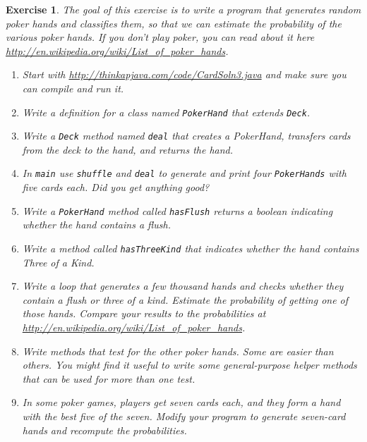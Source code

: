 \documentclass[12pt]{book}
\theoremstyle{exercise}
\newtheorem{exercise}{Exercise}[chapter]
\begin{document}
\begin{exercise}
The goal of this exercise is to write a program that generates random
poker hands and classifies them, so that we can estimate the
probability of the various poker hands.  If you don't play poker, you
can read about it here
\url{http://en.wikipedia.org/wiki/List_of_poker_hands}.

\begin{enumerate}

\item Start with \url{http://thinkapjava.com/code/CardSoln3.java}
and make sure you can compile and run it.

\item Write a definition for a class named {\tt PokerHand}
that extends {\tt Deck}.

\item Write a {\tt Deck} method named {\tt deal} that creates
a PokerHand, transfers cards from the deck to the hand, and returns
the hand.

\item In {\tt main} use {\tt shuffle} and
{\tt deal} to generate and print four {\tt PokerHands} with
five cards each.  Did you get anything good?

\item Write a {\tt PokerHand} method called {\tt hasFlush}
returns a boolean indicating whether the
hand contains a flush.

\item Write a method called {\tt hasThreeKind} that
indicates whether the hand contains
Three of a Kind.

\item Write a loop that generates a few thousand hands and
checks whether they contain a flush or three of a kind.
Estimate the probability of getting one of those hands.
Compare your results to the probabilities at
\url{http://en.wikipedia.org/wiki/List_of_poker_hands}.

\item Write methods that test for the other poker hands.  Some
are easier than others.  You might find it useful to write some
general-purpose helper methods that can be used for more than one
test.

\item In some poker games, players get seven cards each, and
they form a hand with the best five of the seven.  Modify your
program to generate seven-card hands and recompute the probabilities.

\end{enumerate}
\end{exercise}
\end{document}

